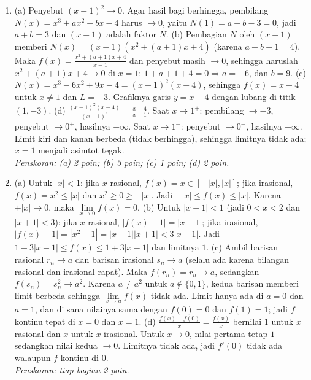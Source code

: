 \documentclass[a4paper,11pt]{article}
\newcounter{no}
\begin{document}
\begin{enumerate}[leftmargin=2em,itemsep=3pt,topsep=2pt]
\item[\textbf{4.}] (a) Penyebut $(x-1)^2\to0$. Agar hasil bagi berhingga, pembilang $N(x)=x^3+ax^2+bx-4$ harus $\to0$, yaitu $N(1)=a+b-3=0$, jadi $a+b=3$ dan $(x-1)$ adalah faktor $N$. (b) Pembagian $N$ oleh $(x-1)$ memberi $N(x)=(x-1)\left(x^2+(a+1)x+4\right)$ (karena $a+b+1=4$). Maka $f(x)=\frac{x^2+(a+1)x+4}{x-1}$ dan penyebut masih $\to0$, sehingga haruslah $x^2+(a+1)x+4\to0$ di $x=1$: $1+a+1+4=0\Rightarrow a=-6$, dan $b=9$. (c) $N(x)=x^3-6x^2+9x-4=(x-1)^2(x-4)$, sehingga $f(x)=x-4$ untuk $x\ne1$ dan $L=-3$. Grafiknya garis $y=x-4$ dengan lubang di titik $(1,-3)$. (d) $\frac{(x-1)^2(x-4)}{(x-1)^3}=\frac{x-4}{x-1}$. Saat $x\to1^+$: pembilang $\to-3$, penyebut $\to0^+$, hasilnya $-\infty$. Saat $x\to1^-$: penyebut $\to0^-$, hasilnya $+\infty$. Limit kiri dan kanan berbeda (tidak berhingga), sehingga limitnya tidak ada; $x=1$ menjadi asimtot tegak. \\ \textit{Penskoran: (a) 2 poin; (b) 3 poin; (c) 1 poin; (d) 2 poin.}
\item[\textbf{5.}] (a) Untuk $|x|<1$: jika $x$ rasional, $f(x)=x\in[-|x|,|x|]$; jika irasional, $f(x)=x^2\le|x|$ dan $x^2\ge0\ge-|x|$. Jadi $-|x|\le f(x)\le|x|$. Karena $\pm|x|\to0$, maka $\lim\limits_{x\to0}f(x)=0$. (b) Untuk $|x-1|<1$ (jadi $0<x<2$ dan $|x+1|<3$): jika $x$ rasional, $|f(x)-1|=|x-1|$; jika irasional, $|f(x)-1|=|x^2-1|=|x-1||x+1|<3|x-1|$. Jadi $1-3|x-1|\le f(x)\le1+3|x-1|$ dan limitnya $1$. (c) Ambil barisan rasional $r_n\to a$ dan barisan irasional $s_n\to a$ (selalu ada karena bilangan rasional dan irasional rapat). Maka $f(r_n)=r_n\to a$, sedangkan $f(s_n)=s_n^2\to a^2$. Karena $a\ne a^2$ untuk $a\notin\{0,1\}$, kedua barisan memberi limit berbeda sehingga $\lim\limits_{x\to a}f(x)$ tidak ada. Limit hanya ada di $a=0$ dan $a=1$, dan di sana nilainya sama dengan $f(0)=0$ dan $f(1)=1$; jadi $f$ kontinu tepat di $x=0$ dan $x=1$. (d) $\frac{f(x)-f(0)}{x}=\frac{f(x)}{x}$ bernilai $1$ untuk $x$ rasional dan $x$ untuk $x$ irasional. Untuk $x\to0$, nilai pertama tetap $1$ sedangkan nilai kedua $\to0$. Limitnya tidak ada, jadi $f'(0)$ tidak ada walaupun $f$ kontinu di $0$. \\ \textit{Penskoran: tiap bagian 2 poin.}
\end{enumerate}
\end{document}
